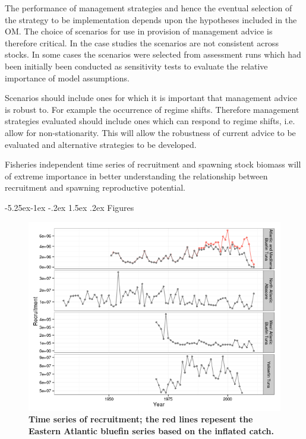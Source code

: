 \documentclass[a4paper, 10pt]{article}
\makeatletter
\renewcommand{\section}{\@startsection{section}{1}{\z@}%
  {-5.25ex\@plus -1ex \@minus -.2ex}%
  {1.5ex \@plus .2ex}%
  {\normalfont\bfseries}}
\makeatother
\begin{document}
The performance of management strategies and hence the eventual selection of the strategy to be implementation depends upon the hypotheses
included in the OM. The choice of scenarios for use in provision of management advice is therefore critical. In the case studies the 
scenarios are not consistent across stocks.
In some cases the scenarios were selected from assessment runs which had been initially been conducted as
sensitivity tests to evaluate the relative importance of model assumptions. 

Scenarios should include ones for which it is important that management advice is robust to. For example the occurrence 
of regime shifts. Therefore management strategies evaluated should include ones which can 
respond to regime shifts, i.e. allow for non-stationarity. This will allow the robustness of current advice to be evaluated
and alternative strategies to be developed.

Fisheries independent time series of  recruitment and spawning stock biomass will of extreme importance in better understanding
the relationship between recruitment and spawning reproductive potential.


\newpage
 
 

\newpage\clearpage\section{Figures} 

\begin{figure}[!ht]\begin{center} 
\includegraphics{figs/sr-rec.png}
\end{center}
\caption{\bf{Time series of recruitment; the red lines repesent the Eastern Atlantic bluefin series based on the inflated catch.}}
\label{rec}\end{figure} 
\end{document}
